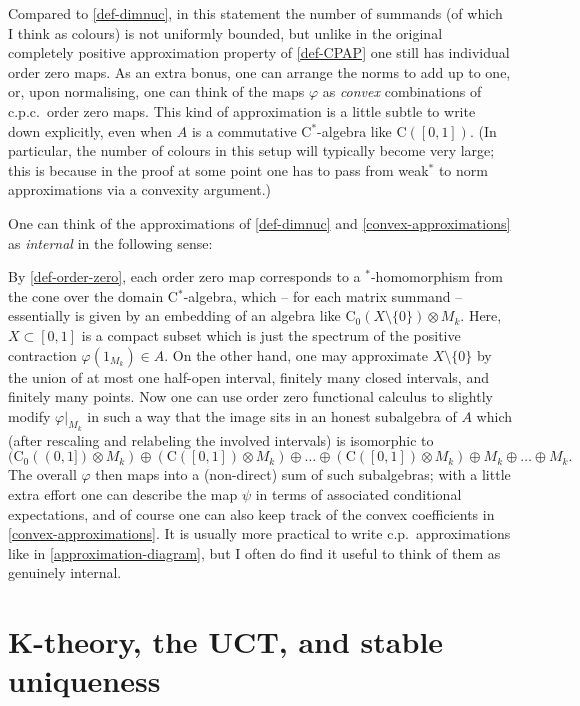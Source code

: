 \documentclass{amsart}
\newcounter{number}[section]
\newenvironment{nummer}{\refstepcounter{number}{\noindent\arabic{section}.\arabic{number}}}{}
\newcommand{\bn}{\noindent \begin{nummer} \rm}
\newcommand{\en}{\end{nummer}}
\begin{document}
Compared to \ref{def-dimnuc}, in this statement the number of summands (of which I think as colours) is not uniformly bounded, but unlike in the original completely positive approximation property of \ref{def-CPAP} one still has individual order zero maps. As an extra bonus, one can arrange the norms to add up to one, or, upon normalising, one can think of the maps $\varphi$ as \emph{convex} combinations of c.p.c.\ order zero maps. This kind of approximation is a little subtle to write down explicitly, even when $A$ is a commutative C$^*$-algebra like $\mathrm{C}([0,1])$. (In particular, the number of colours in this setup will typically become very large; this is because in the proof at some point one has to pass from weak$^*$ to norm approximations via a convexity argument.) 
\en





\bn
One can think of the approximations of \ref{def-dimnuc} and \ref{convex-approximations} as \emph{internal} in the following sense:

By \ref{def-order-zero}, each order zero map corresponds to a $^*$-homomorphism from the cone over the domain C$^*$-algebra, which -- for each matrix summand -- essentially is given by an embedding of an algebra like $\mathrm{C}_0(X \setminus \{0\}) \otimes M_k$. Here, $X \subset [0,1]$ is a compact subset which is just the spectrum of the positive contraction $\varphi(1_{M_k}) \in A$. On the other hand, one may approximate $X \setminus\{0\}$ by the union of at most one half-open interval, finitely many  closed intervals, and finitely many points. Now one can use order zero functional calculus to slightly modify $\varphi|_{M_k}$ in such a way that the image sits in an honest subalgebra of $A$ which (after rescaling and relabeling the involved intervals) is isomorphic to 
\[
(\mathrm{C}_0((0,1]) \otimes M_k) \oplus (\mathrm{C}([0,1]) \otimes M_k) \oplus \ldots \oplus (\mathrm{C}([0,1]) \otimes M_k) \oplus M_k \oplus \ldots \oplus M_k.
\]
The overall $\varphi$ then maps into a (non-direct) sum of such subalgebras; with a little extra effort one can describe the map $\psi$ in terms of associated conditional expectations, and of course one can also keep track of the convex coefficients in \ref{convex-approximations}. It is usually more practical to write c.p.\ approximations like in \eqref{approximation-diagram}, but I often do find it useful to think of them as genuinely internal.
\en

\section{K-theory, the UCT, and stable uniqueness}
\label{section2}
\end{document}
